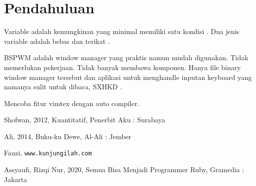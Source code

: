 \documentclass{article}
\begin{document}
\section{Pendahuluan}
Variable adalah kemungkinan yang minimal memiliki satu kondisi \cite{Shofwan}. Dua jenis variable adalah bebas dan terikat \cite{Ali, Fauzi}.

BSPWM adalah window manager yang praktis namun mudah digunakan. Tidak memerlukan pekerjaan. Tidak banyak membawa komponen. Hanya file binary window manager tersebut dan aplikasi untuk menghandle inputan keyboard yang namanya sulit untuk dibaca, SXHKD \cite{Rizqi}.

Mencoba fitur vimtex dengan auto compiler.


\begin{thebibliography}{3}
  Shofwan, 2012, Kuantitatif, Penerbit Aku : Surabaya

  Ali, 2014, Buku-ku Dewe, Al-Ali : Jember

  Fauzi, \texttt{www.kunjungilah.com}

  Assyaufi, Rizqi Nur, 2020, Semua Bisa Menjadi Programmer Ruby, Gramedia : Jakarta
\end{thebibliography}
\end{document}
